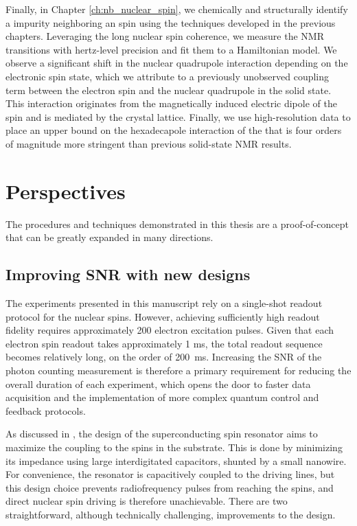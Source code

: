 Finally, in Chapter \ref{ch:nb_nuclear_spin}, we chemically and structurally identify a \Nb impurity neighboring an \Er spin using the techniques developed in the previous chapters. Leveraging the long nuclear spin coherence, we measure the NMR transitions with hertz-level precision and fit them to a Hamiltonian model. We observe a significant shift in the nuclear quadrupole interaction depending on the electronic spin state, which we attribute to a previously unobserved coupling term between the electron spin and the nuclear quadrupole in the solid state. This interaction originates from the magnetically induced electric dipole of the \Er spin and is mediated by the crystal lattice. Finally, we use high-resolution data to place an upper bound on the hexadecapole interaction of the \Nb that is four orders of magnitude more stringent than previous solid-state NMR results.

\section*{Perspectives}

The procedures and techniques demonstrated in this thesis are a proof-of-concept that can be greatly expanded in many directions.

\subsection*{Improving SNR with new designs}

The experiments presented in this manuscript rely on a single-shot readout protocol for the nuclear spins. However, achieving sufficiently high readout fidelity requires approximately 200 electron excitation pulses. Given that each electron spin readout takes approximately 1 ms, the total readout sequence becomes relatively long, on the order of 200~ms. Increasing the SNR of the photon counting measurement is therefore a primary requirement for reducing the overall duration of each experiment, which opens the door to faster data acquisition and the implementation of more complex quantum control and feedback protocols.

As discussed in , the design of the superconducting spin resonator aims to maximize the coupling to the \Er spins in the \Ca substrate. This is done by minimizing its impedance using large interdigitated capacitors, shunted by a small nanowire. For convenience, the resonator is capacitively coupled to the driving lines, but this design choice prevents radiofrequency pulses from reaching the spins, and direct nuclear spin driving is therefore unachievable. There are two straightforward, although technically challenging, improvements to the design.

